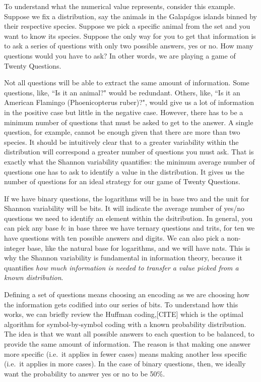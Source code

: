 \documentclass[prb, twocolumn]{revtex4-1}
\begin{document}
To understand what the numerical value represents, consider this example. Suppose we fix a distribution, say the animals in the Galap\'{a}gos islands binned by their respective species. Suppose we pick a specific animal from the set and you want to know its species. Suppose the only way for you to get that information is to ask a series of questions with only two possible answers, yes or no. How many questions would you have to ask? In other words, we are playing a game of Twenty Questions.

Not all questions will be able to extract the same amount of information. Some questions, like, ``Is it an animal?" would be redundant. Others, like, ``Is it an American Flamingo (Phoenicopterus ruber)?", would give us a lot of information in the positive case but little in the negative case. However, there has to be a minimum number of questions that must be asked to get to the answer. A single question, for example, cannot be enough given that there are more than two species. It should be intuitively clear that to a greater variability within the distribution will correspond a greater number of questions you must ask. That is exactly what the Shannon variability quantifies: the minimum average number of questions one has to ask to identify a value in the distribution. It gives us the number of questions for an ideal strategy for our game of Twenty Questions.

If we have binary questions, the logarithms will be in base two and the unit for Shannon variability will be bits. It will indicate the average number of yes/no questions we need to identify an element within the dsitribution. In general, you can pick any base $b$: in base three we have ternary questions and trits, for ten we have questions with ten possible answers and digits. We can also pick a non-integer base, like the natural base for logarithms, and we will have nats. This is why the Shannon variability is fundamental in information theory, because it quantifies \emph{how much information is needed to transfer a value picked from a known distribution}.

Defining a set of questions means choosing an encoding as we are choosing how the information gets codified into our series of bits. To understand how this works, we can briefly review the Huffman coding,[CITE] which is the optimal algorithm for symbol-by-symbol coding with a known probability distribution. The idea is that we want all possible answers to each question to be balanced, to provide the same amount of information. The reason is that making one answer more specific (i.e.~it applies in fewer cases) means making another less specific (i.e.~it applies in more cases). In the case of binary questions, then, we ideally want the probability to answer yes or no to be 50\%.
\end{document}
